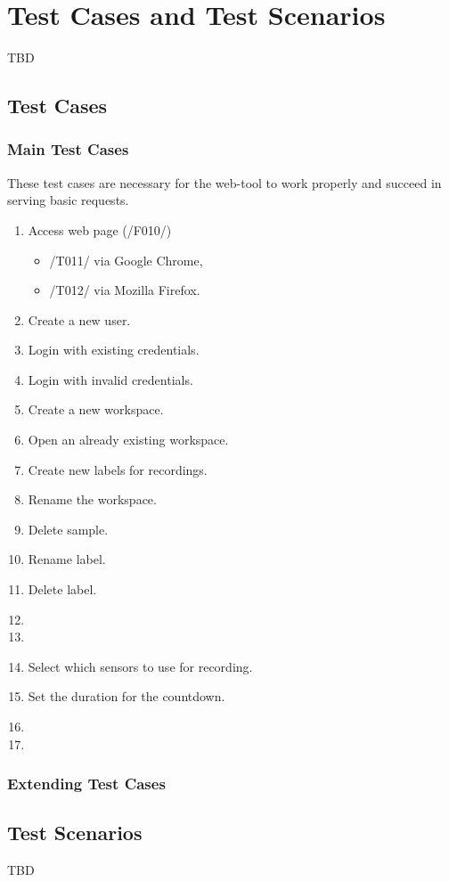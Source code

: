 \section{Test Cases and Test Scenarios}
TBD
\subsection{Test Cases}
\subsubsection{Main Test Cases}
These test cases are necessary for the web-tool to work properly and succeed in serving
basic requests.

\begin{enumerate}[{label = \textbf{/T{\protect\twodigits{\arabic{enumi}}}0/}, leftmargin = *}]
    \item Access web page (/F010/)
    \begin{itemize}
        \item /T011/ via Google Chrome,
        \item /T012/ via Mozilla Firefox.
    \end{itemize}
    \item Create a new user.
    \item Login with existing credentials.
    \item Login with invalid credentials.
    \item Create a new workspace.
    \item Open an already existing workspace.
    \item Create new labels for recordings.
    \item Rename the workspace.
    \item Delete sample.
    \item Rename label.
    \item Delete label.
    \item 
    \item 
    \item Select which sensors to use for recording.
    \item Set the duration for the countdown.
    \item 
    \item 
\end{enumerate}
\subsubsection{Extending Test Cases}
\subsection{Test Scenarios}
TBD